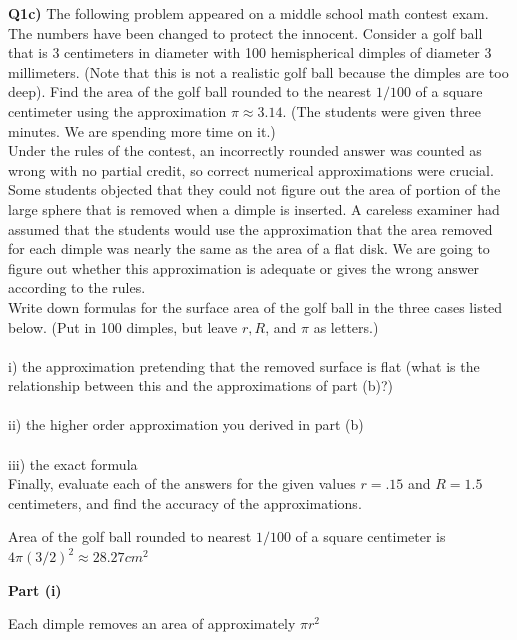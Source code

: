 \documentclass[9pt]{article}
\begin{document}
\begin{tcolorbox}
  \textbf{Q1c)} The following problem appeared on a middle school math contest exam. The numbers have been changed to protect the innocent. Consider a golf ball that is 3 centimeters in diameter with 100 hemispherical dimples of diameter 3 millimeters. (Note that this is not a realistic golf ball because the dimples are too deep). Find the area of the golf ball rounded to the nearest $1/100$ of a square centimeter using the approximation $\pi \approx 3.14$. (The students were given three minutes. We are spending more time on it.) \\

  Under the rules of the contest, an incorrectly rounded answer was counted as wrong with no partial credit, so correct numerical approximations were crucial. Some students objected that they could not figure out the area of portion of the large sphere that is removed when a dimple is inserted. A careless examiner had assumed that the students would use the approximation that the area removed for each dimple was nearly the same as the area of a flat disk. We are going to figure out whether this approximation is adequate or gives the wrong answer according to the rules.\\

  Write down formulas for the surface area of the golf ball in the three cases listed below. (Put in 100 dimples, but leave $r, R$, and $\pi$ as letters.)\\
  \\
  i) the approximation pretending that the removed surface is flat (what is the relationship between this and the approximations of part (b)?)\\
  \\
  ii) the higher order approximation you derived in part (b)\\
  \\
  iii) the exact formula\\

  Finally, evaluate each of the answers for the given values $r = .15$ and $R = 1.5$ centimeters, and find the accuracy of the approximations.
\end{tcolorbox}

Area of the golf ball rounded to nearest $1 / 100$ of a square centimeter is $4 \pi (3 / 2)^2 \approx 28.27 cm^2$

\textbf{Part (i)}

Each dimple removes an area of approximately $\pi r^2$
\end{document}
